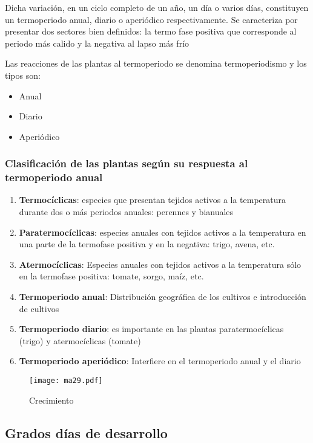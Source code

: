 Dicha variación, en un ciclo completo de un año, un día o varios días, constituyen un termoperiodo anual, diario o aperiódico respectivamente. Se caracteriza por presentar dos sectores bien definidos: la termo fase positiva que corresponde al periodo más calido y la negativa al lapso más frío

\begin{definition}[Termoperiodismo]
    Las reacciones de las plantas al termoperiodo se denomina termoperiodismo y los tipos son:
    \begin{itemize}
        \item Anual
        \item Diario
        \item Aperiódico
    \end{itemize}
\end{definition}
\subsubsection{Clasificación de las plantas según su respuesta al termoperiodo anual}
\begin{enumerate}
    \item \textbf{Termocíclicas}: especies que presentan tejidos activos a la temperatura durante dos o más periodos anuales: perennes y bianuales
    \item \textbf{Paratermocíclicas}: especies anuales con tejidos activos a la temperatura en una parte de la termofase positiva y en la negativa: trigo, avena, etc.
    \item \textbf{Atermocíclicas}: Especies anuales con tejidos activos a la temperatura sólo en la termofase positiva: tomate, sorgo, maíz, etc.
    \item \textbf{Termoperiodo anual}: Distribución geográfica de los cultivos e introducción de cultivos
    \item \textbf{Termoperiodo diario}: es importante en las plantas paratermocíclicas (trigo) y atermocíclicas (tomate)
    \item \textbf{Termoperiodo aperiódico}: Interfiere en el termoperiodo anual y el diario
\end{enumerate}
\begin{figure}[h!]
\centering
  \texttt{[image: ma29.pdf]}
  \caption{Crecimiento}
  \label{ma29}
\end{figure}

\subsection{Grados días de desarrollo}

